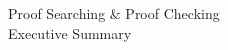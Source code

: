 \documentclass[12pt,a4paper]{scrartcl}
\begin{document}
  \begin{center}
    {\Large Proof Searching \& Proof Checking \\
      \vspace{0.2cm}
      Executive Summary}
  \end{center}

\vspace{0.5cm}






\end{document}
